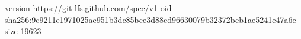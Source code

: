 version https://git-lfs.github.com/spec/v1
oid sha256:9c9211e1971025ae951b3dc85bce3d88cd96630079b32372beb1ae5241e47a6e
size 19623
